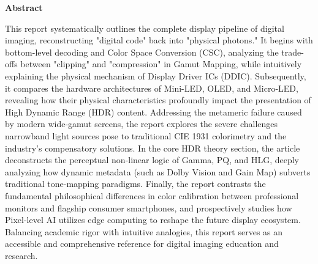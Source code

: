 \documentclass[12pt, a4paper]{ctexart}
\begin{document}
\newpage
{}
{} %
\begin{center}
    {\textbf{Abstract}} 
\end{center}
\vspace{1em}
{ %
\setlength{\parindent}{2em}
This report systematically outlines the complete display pipeline of digital imaging, reconstructing "digital code" back into "physical photons." It begins with bottom-level decoding and Color Space Conversion (CSC), analyzing the trade-offs between "clipping" and "compression" in Gamut Mapping, while intuitively explaining the physical mechanism of Display Driver ICs (DDIC). Subsequently, it compares the hardware architectures of Mini-LED, OLED, and Micro-LED, revealing how their physical characteristics profoundly impact the presentation of High Dynamic Range (HDR) content. Addressing the metameric failure caused by modern wide-gamut screens, the report explores the severe challenges narrowband light sources pose to traditional CIE 1931 colorimetry and the industry's compensatory solutions. In the core HDR theory section, the article deconstructs the perceptual non-linear logic of Gamma, PQ, and HLG, deeply analyzing how dynamic metadata (such as Dolby Vision and Gain Map) subverts traditional tone-mapping paradigms. Finally, the report contrasts the fundamental philosophical differences in color calibration between professional monitors and flagship consumer smartphones, and prospectively studies how Pixel-level AI utilizes edge computing to reshape the future display ecosystem. Balancing academic rigor with intuitive analogies, this report serves as an accessible and comprehensive reference for digital imaging education and research.\par
}

\vfill

\newpage
{}
{} 
\renewcommand{\contentsname}{\centering\heiti\zihao{3} 目\quad 录}
\tableofcontents


\newpage
{} %
\renewcommand{\thepage}{\ifnum\value{page}<10 0\arabic{page}\else\arabic{page}\fi} %
\end{document}
